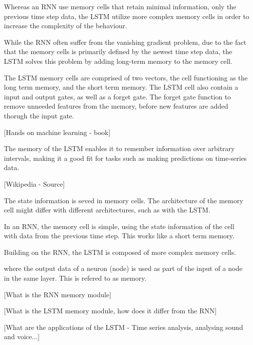 Whereas an RNN use memory cells that retain minimal information, only the previous time step data, the LSTM utilize more complex memory cells in order to increase the complexity of the behaviour.

While the RNN often suffer from the vanishing gradient problem, due to the fact that the memory cells is primarily defined by the newest time step data, the LSTM solves this problem by adding long-term memory to the memory cell.

The LSTM memory cells are comprised of two vectors, the cell functioning as the long term memory, and the short term memory.
The LSTM cell also contain a input and output gates, as well as a forget gate.
The forget gate function to remove unneeded features from the memory, before new features are added thorugh the input gate.

[Hands on machine learning - book]

The memory of the LSTM enables it to remember information over arbitrary intervals, making it a good fit for tasks such as making predictions on time-series data.

[Wikipedia - Source]





The state information is seved in memory cells.
The architecture of the memory cell might differ with different architectures, such as with the LSTM.

In an RNN, the memory cell is simple, using the state information of the cell with data from the previous time step.
This works like a short term memory.

Building on the RNN, the LSTM is composed of more complex memory cells.



where the output data of a neuron (node) is used as part of the input of a node in the same layer.
This is refered to as memory.

[What is the RNN memory module]

[What is the LSTM memory module, how does it differ from the RNN]

[What are the applications of the LSTM - Time series analysis, analysing sound and voice...]

\fi
